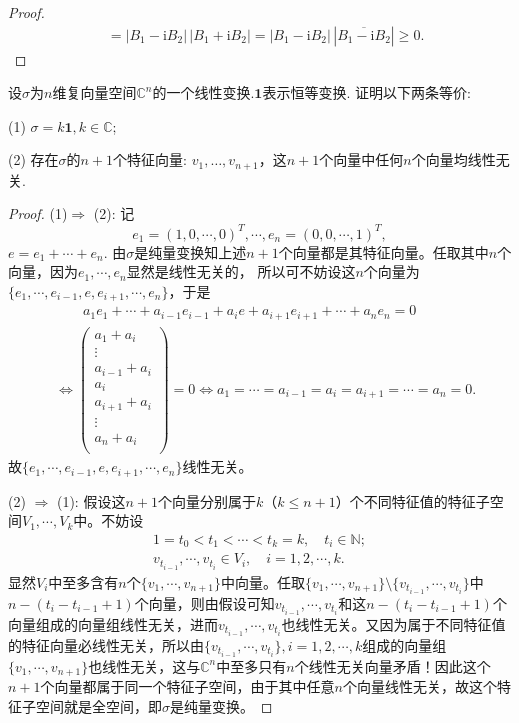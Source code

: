 \documentclass[../../main.tex]{subfiles}
\begin{document}
\begin{proof}
\begin{align*}
&= |B_1 - \text{i}B_2| \, |B_1 +  \text{i}B_2| = |B_1 - \text{i}B_2| \, |\overline{B_1 -  \text{i}B_2}| \geqslant 0.
\end{align*}
\end{proof}

\begin{example}
设\(\sigma\)为\(n\)维复向量空间\(\mathbb{C}^n\)的一个线性变换.\(\mathbf{1}\)表示恒等变换. 证明以下两条等价:

(1) \(\sigma = k\mathbf{1}, k \in \mathbb{C}\);

(2) 存在\(\sigma\)的\(n + 1\)个特征向量: \(v_1, \dots, v_{n+1}\)，这\(n + 1\)个向量中任何\(n\)个向量均线性无关.
\end{example}
\begin{proof}
(1)$\Longrightarrow$ (2): 记
$$e_1=(1,0,\cdots,0)^T,\cdots,e_n=(0,0,\cdots,1)^T,$$
$e=e_1+\cdots+e_n$.
由$\sigma$是纯量变换知上述$n+1$个向量都是其特征向量。任取其中$n$个向量，因为$e_1,\cdots,e_n$显然是线性无关的，
所以可不妨设这$n$个向量为$\{e_1,\cdots,e_{i-1},e,e_{i+1},\cdots,e_n\}$，于是
\begin{align*}
&\quad \quad a_1e_1+\cdots +a_{i-1}e_{i-1}+a_ie+a_{i+1}e_{i+1}+\cdots +a_ne_n=0
\\
&\Longleftrightarrow \left( \begin{array}{c}
a_1+a_i\\
\vdots\\
a_{i-1}+a_i\\
a_i\\
a_{i+1}+a_i\\
\vdots\\
a_n+a_i\\
\end{array} \right) =0\Longleftrightarrow a_1=\cdots =a_{i-1}=a_i=a_{i+1}=\cdots =a_n=0.
\end{align*}
故$\{e_1,\cdots,e_{i-1},e,e_{i+1},\cdots,e_n\}$线性无关。

(2) $\Longrightarrow$ (1): 假设这$n+1$个向量分别属于$k$（$k\leqslant n+1$）个不同特征值的特征子空间$V_1,\cdots,V_k$中。不妨设
\begin{gather*}
1=t_0<t_1<\cdots<t_k=k,\quad t_i\in \mathbb{N};
\\
v_{t_{i-1}},\cdots,v_{t_i}\in V_i,\quad i=1,2,\cdots,k.
\end{gather*}
显然$V_i$中至多含有$n$个$\{v_1,\cdots,v_{n+1}\}$中向量。任取$\{v_1,\cdots,v_{n+1}\}\setminus\{v_{t_{i-1}},\cdots,v_{t_i}\}$中$n-(t_i-t_{i-1}+1)$个向量，则由假设可知$v_{t_{i-1}},\cdots,v_{t_i}$和这$n-(t_i-t_{i-1}+1)$个向量组成的向量组线性无关，进而$v_{t_{i-1}},\cdots,v_{t_i}$也线性无关。又因为属于不同特征值的特征向量必线性无关，所以由$\{v_{t_{i-1}},\cdots,v_{t_i}\},i=1,2,\cdots,k$组成的向量组$\{v_1,\cdots,v_{n+1}\}$也线性无关，这与$\mathbb{C}^n$中至多只有$n$个线性无关向量矛盾！因此这个$n+1$个向量都属于同一个特征子空间，由于其中任意$n$个向量线性无关，故这个特征子空间就是全空间，即$\sigma$是纯量变换。
\end{proof}
\end{document}
